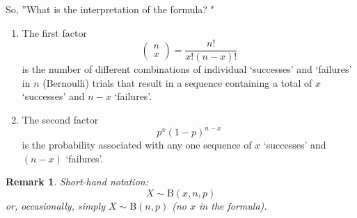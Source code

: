 \documentclass[smaller, handout]{beamer}\usepackage[]{graphicx}\usepackage[]{color}
\newtheorem{remark}{Remark}[section]
\newenvironment{stepenumerate}{\begin{enumerate}[<+->]}{\end{enumerate}}
\begin{document}
\begin{frame}{\secname}

So, ''What is the interpretation of the formula? "


\begin{stepenumerate}
\item The first factor $$\left(
\begin{array}{c}
n \\
x%
\end{array}%
\right) =\frac{n!}{x!\left( n-x\right) !}$$ is the number of different
combinations of individual `successes' and `failures'  in $n$ (Bernoulli) trials that result in a sequence containing a total of $%
x $ `successes' and $n-x$ `failures'.


\item The second factor $$p^{x}\left( 1-p\right) ^{n-x}$$ is the probability associated with any one
sequence of $x$ `successes' and $(n-x)$ `failures'.
\end{stepenumerate}

\begin{remark}
Short-hand notation: $$ X \sim \text{B}(x,n,p)$$
 or, occasionally, simply $ X \sim \text{B} (n,p)$ (no $x$ in the formula).
\end{remark}

\end{frame}%
\end{document}
